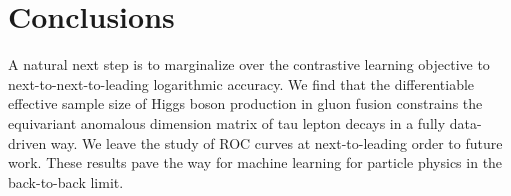 \section{Conclusions}\label{sec:conclusions}

A natural next step is to marginalize over the contrastive learning
objective to next-to-next-to-leading logarithmic accuracy. We find that
the differentiable effective sample size of Higgs boson production in
gluon fusion constrains the equivariant anomalous dimension matrix of
tau lepton decays in a fully data-driven way. We leave the study of ROC
curves at next-to-leading order to future work. These results pave the
way for machine learning for particle physics in the back-to-back limit.

